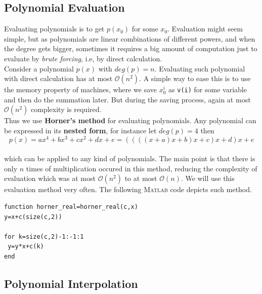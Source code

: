 \documentclass[paper=a4, fontsize=11pt]{scrartcl}
\newcommand{\MATLAB}{\textsc{Matlab}\xspace}
\begin{document}
\subsection{Polynomial Evaluation}
\vspace{0.15in}
Evaluating polynomials is to get $p(x_0)$ for some $x_0$. Evaluation might seem simple, but as polynomials are linear combinations of different powers, and when the degree gets bigger, sometimes it requires a big amount of computation just to evaluate by \textit{brute forcing}, i.e, by direct calculation. \\

Consider a polynomial $p(x)$ with $deg(p)=n$. Evaluating such polynomial with direct calculation has at most $\mathcal{O}(n^2)$. A simple way to ease this is to use the memory property of machines, where we save $x_0^i$ as \texttt{v(i)} for some variable and then do the summation later. But during the saving process, again at most $\mathcal{O}(n^2)$ complexity is required.\\

 Thus we use \textbf{Horner's method} for evaluating polynomials. Any polynomial can be expressed in its \textbf{nested form}, for instance let $deg(p)=4$ then \\
 
 \begin{equation}\nonumber
 	p(x) = ax^4 + bx^3 + cx^2 + dx +e = \left( \left(\left(\left(x+a\right)x+b\right)x+c\right)x +d\right)x + e
 \end{equation}\\
 
 which can be applied to any kind of polynomials. The main point is that there is only $n$ times of multiplication occured in this method, reducing the complexity of evaluation which was at most $\mathcal{O}(n^2)$ to at most $\mathcal{O}(n)$. We will use this evaluation method very often. The following \MATLAB code depicts such method.\\

\begin{lstlisting}[caption='horner.m']
function horner_real=horner_real(c,x)
y=x+c(size(c,2))

for k=size(c,2)-1:-1:1
 y=y*x+c(k) 
end

\end{lstlisting}

 
\vspace{0.15in}
\subsection{Polynomial Interpolation}
\vspace{0.15in}
\end{document}

